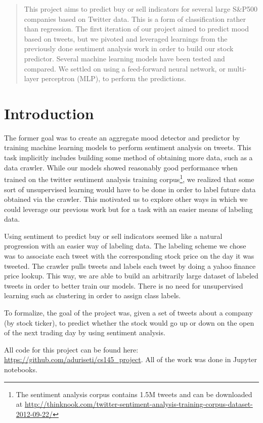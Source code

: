 \documentclass{sig-alternate-05-2015}
\begin{document}
\maketitle

	\maketitle
	\begin{abstract}
		This project aims to predict buy or sell indicators for several large S\&P500 companies based on Twitter data. This is a form of classification rather than regression. The first iteration of our project aimed to predict mood based on tweets, but we pivoted and leveraged learnings from the previously done sentiment analysis work in order to build our stock predictor. Several machine learning models have been tested and compared. We settled on using a feed-forward neural network, or multi-layer perceptron (MLP), to perform the predictions.  
	\end{abstract}
	
	
	\section{Introduction}
	The former goal was to create an aggregate mood detector and predictor by training machine learning models to perform sentiment analysis on tweets. This task implicitly includes building some method of obtaining more data, such as a data crawler. While our models showed reasonably good performance when trained on the twitter sentiment analysis training corpus\footnote{The sentiment analysis corpus contains 1.5M tweets and can be downloaded at \url{http://thinknook.com/twitter-sentiment-analysis-training-corpus-dataset-2012-09-22/}}, we realized that some sort of unsupervised learning would have to be done in order to label future data obtained via the crawler. This motivated us to explore other ways in which we could leverage our previous work but for a task with an easier means of labeling data.
	\par
	Using sentiment to predict buy or sell indicators seemed like a natural progression with an easier way of labeling data. The labeling scheme we chose was to associate each tweet with the corresponding stock price on the day it was tweeted. The crawler pulls tweets and labels each tweet by doing a yahoo finance price lookup. This way, we are able to build an arbitrarily large dataset of labeled tweets in order to better train our models. There is no need for unsupervised learning such as clustering in order to assign class labels.
	\par
	To formalize, the goal of the project was, given a set of tweets about a company (by stock ticker), to predict whether the stock would go up or down on the open of the next trading day by using sentiment analysis.
	\par
	All code for this project can be found here: \url{https://github.com/aduriseti/cs145_project}. All of the work was done in Jupyter notebooks.
\end{document}
